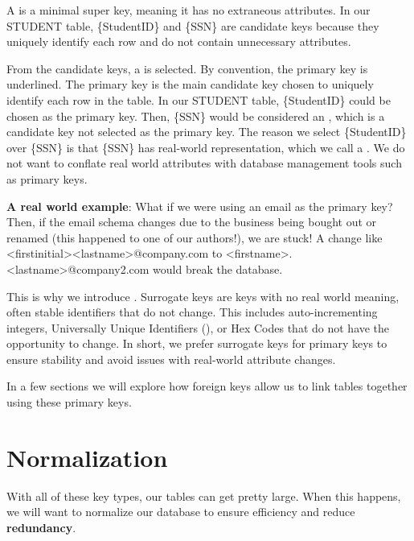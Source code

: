 A  is a minimal super key, meaning it has no extraneous attributes. In our STUDENT table, \{StudentID\} and \{SSN\} are candidate keys because they uniquely identify each row and do not contain unnecessary attributes.

From the candidate keys, a  is selected. By convention, the primary key is underlined. The primary key is the main candidate key chosen to uniquely identify each row in the table. In our STUDENT table, \{StudentID\} could be chosen as the primary key. Then, \{SSN\} would be considered an , which is a candidate key not selected as the primary key. The reason we select \{StudentID\} over \{SSN\} is that \{SSN\} has real-world representation, which we call a . We do not want to conflate real world attributes with database management tools such as primary keys. 

\textbf{A real world example}: What if we were using an email as the primary key? Then, if the email schema changes due to the business being bought out or renamed (this happened to one of our authors!), we are stuck! A change like \textsf{<firstinitial><lastname>@company.com} to \textsf{<firstname>.<lastname>@company2.com} would break the database. 

This is why we introduce . Surrogate keys are keys with no real world meaning, often stable identifiers that do not change. This includes auto-incrementing integers, Universally Unique Identifiers (), or Hex Codes that do not have the opportunity to change. In short, we prefer surrogate keys for primary keys to ensure stability and avoid issues with real-world attribute changes.

In a few sections we will explore how foreign keys allow us to link tables together using these primary keys.


\section{Normalization}
With all of these key types, our tables can get pretty large. When this happens, we will want to normalize our database to ensure efficiency and reduce \textbf{redundancy}.

